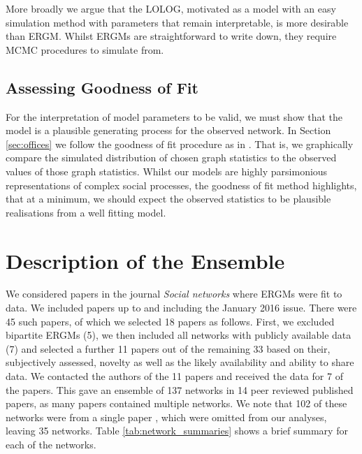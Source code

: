 \documentclass[
]{statsoc}
\begin{document}
More broadly we argue that the LOLOG, motivated as a model with an easy
simulation method with parameters that remain interpretable, is more
desirable than ERGM. Whilst ERGMs are straightforward to write down,
they require MCMC procedures to simulate from.

\subsection{Assessing Goodness of Fit}

For the interpretation of model parameters to be valid, we must show
that the model is a plausible generating process for the observed
network. In Section \ref{sec:offices} we follow the goodness of fit
procedure as in \cite{Hunter_Goodreau_2008}. That is, we graphically
compare the simulated distribution of chosen graph statistics to the
observed values of those graph statistics. Whilst our models are highly
parsimonious representations of complex social processes, the goodness
of fit method highlights, that at a minimum, we should expect the
observed statistics to be plausible realisations from a well fitting
model.

\section{Description of the Ensemble}\label{sec:description}

We considered papers in the journal \emph{Social networks} where ERGMs
were fit to data. We included papers up to and including the January
2016 issue. There were 45 such papers, of which we selected 18 papers as
follows. First, we excluded bipartite ERGMs (5), we then included all
networks with publicly available data (7) and selected a further 11
papers out of the remaining 33 based on their, subjectively assessed,
novelty as well as the likely availability and ability to share data. We
contacted the authors of the 11 papers and received the data for 7 of
the papers. This gave an ensemble of 137 networks in 14 peer reviewed
published papers, as many papers contained multiple networks. We note
that 102 of these networks were from a single paper \citep{Lubbers2007},
which were omitted from our analyses, leaving 35 networks. Table
\ref{tab:network_summaries} shows a brief summary for each of the
networks.
\end{document}
